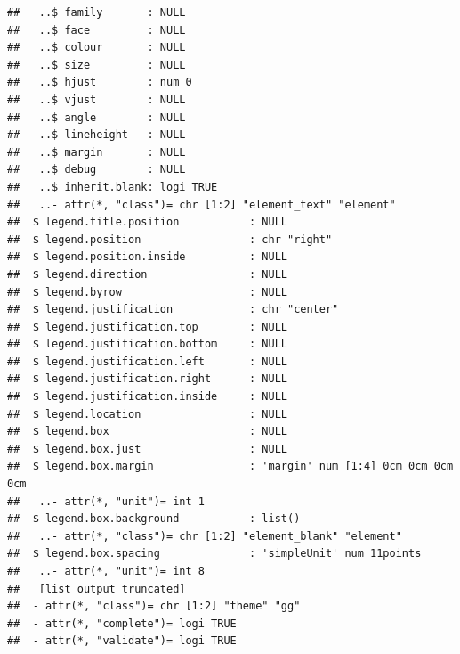 \documentclass[
  12pt,
]{article}
\begin{document}
\begin{verbatim}
##   ..$ family       : NULL
##   ..$ face         : NULL
##   ..$ colour       : NULL
##   ..$ size         : NULL
##   ..$ hjust        : num 0
##   ..$ vjust        : NULL
##   ..$ angle        : NULL
##   ..$ lineheight   : NULL
##   ..$ margin       : NULL
##   ..$ debug        : NULL
##   ..$ inherit.blank: logi TRUE
##   ..- attr(*, "class")= chr [1:2] "element_text" "element"
##  $ legend.title.position           : NULL
##  $ legend.position                 : chr "right"
##  $ legend.position.inside          : NULL
##  $ legend.direction                : NULL
##  $ legend.byrow                    : NULL
##  $ legend.justification            : chr "center"
##  $ legend.justification.top        : NULL
##  $ legend.justification.bottom     : NULL
##  $ legend.justification.left       : NULL
##  $ legend.justification.right      : NULL
##  $ legend.justification.inside     : NULL
##  $ legend.location                 : NULL
##  $ legend.box                      : NULL
##  $ legend.box.just                 : NULL
##  $ legend.box.margin               : 'margin' num [1:4] 0cm 0cm 0cm 0cm
##   ..- attr(*, "unit")= int 1
##  $ legend.box.background           : list()
##   ..- attr(*, "class")= chr [1:2] "element_blank" "element"
##  $ legend.box.spacing              : 'simpleUnit' num 11points
##   ..- attr(*, "unit")= int 8
##   [list output truncated]
##  - attr(*, "class")= chr [1:2] "theme" "gg"
##  - attr(*, "complete")= logi TRUE
##  - attr(*, "validate")= logi TRUE
\end{verbatim}
\end{document}
